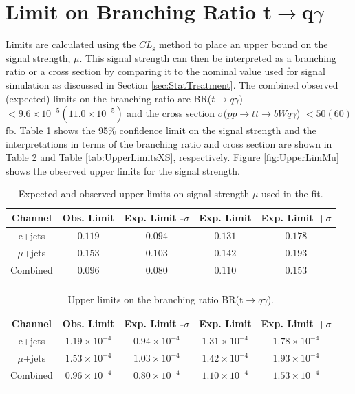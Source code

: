 \section{Limit on Branching Ratio t$\rightarrow$q$\gamma$}
\label{sec:Limits}
Limits are calculated using the $CL_\text{s}$ method to place an upper bound on the signal strength, $\mu$.  This signal strength can then be interpreted as a branching ratio or a cross section by comparing it to the nominal value used for signal simulation as discussed in Section \ref{sec:StatTreatment}.  The combined observed (expected) limits on the branching ratio are  BR($t\rightarrow q \gamma$)$< 9.6\times10^{-5} (11.0\times10^{-5})$ and the cross section $\sigma$($pp\rightarrow t\bar{t} \rightarrow bWq\gamma$) $< 50 (60)$fb.  Table \ref{tab:UpperLimitsMu} shows the 95\% confidence limit on the signal strength and the interpretations in terms of the branching ratio and cross section are shown in Table \ref{tab:UpperLimitsBR} and Table \ref{tab:UpperLimitsXS}, respectively. Figure \ref{fig:UpperLimMu} shows the observed upper limits for the signal strength.
\begin{table}[h!]
\begin{center}
{\renewcommand{\arraystretch}{1.2}
\begin{tabular}{ccccc}
\hhline{=====}
Channel  	&  Obs. Limit			&	Exp. Limit -$\sigma$	& Exp. Limit	& Exp. Limit +$\sigma$  \\  \hline 
e+jets	& $0.119$ 	& $0.094$	& $0.131$ & $0.178$	\\ 
$\mu$+jets	& $0.153$ 	& $0.103$	& $0.142$ & $0.193$	\\ 
Combined	& $0.096$ 	& $0.080$	& $0.110$ & $0.153$	\\
\hhline{=====}
\end{tabular}
\caption{Expected and observed upper limits on signal strength $\mu$ used in the fit.}
\label{tab:UpperLimitsMu}
}
\end{center}
\end{table}


\begin{table}[h!]
\begin{center}
{\renewcommand{\arraystretch}{1.2}
\begin{tabular}{ccccc}
\hhline{=====}
Channel  	&  Obs. Limit			&	Exp. Limit -$\sigma$	& Exp. Limit	& Exp. Limit +$\sigma$  \\  \hline 
e+jets	& $1.19\times10^{-4}$ 	& $0.94\times10^{-4}$	& $1.31\times10^{-4}$ & $1.78\times10^{-4}$	\\ 
$\mu$+jets	& $1.53\times10^{-4}$ 	& $1.03\times10^{-4}$	& $1.42\times10^{-4}$ & $1.93\times10^{-4}$	\\ 
Combined	& $0.96\times10^{-4}$ 	& $0.80\times10^{-4}$	& $1.10\times10^{-4}$ & $1.53\times10^{-4}$	\\
\hhline{=====}
\end{tabular}
\caption{Upper limits on the branching ratio BR(t$\rightarrow q \gamma$).}
\label{tab:UpperLimitsBR}
}
\end{center}
\end{table}

